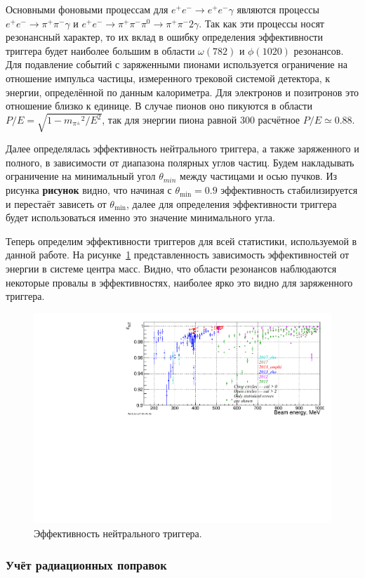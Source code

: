 Основными фоновыми процессам для $e^+ e^- \to e^+ e^-\gamma$ являются процессы
$e^+ e^- \to \pi^+ \pi^- \gamma$ и $e^+ e^- \to \pi^+ \pi^- \pi^0 \to \pi^+ \pi^- 2\gamma$.
Так как эти процессы носят резонансный характер,
то их вклад в ошибку определения эффективности триггера будет наиболее большим в области $\omega (782)$ и $\phi (1020)$ резонансов.
Для подавление событий с заряженными пионами используется ограничение на отношение импульса частицы,
измеренного трековой системой детектора, к энергии, определённой по данным калориметра.
Для электронов и позитронов это отношение близко к единице.
В случае пионов оно пикуются в области $P/E = \sqrt{1 - {m_{\pi^\pm}}^2 / E^2}$,
так для энергии пиона равной \SI{300}{\MeVr} расчётное $P/E \simeq 0.88$.

Далее определялась эффективность нейтрального триггера,
а также заряженного и полного, в зависимости от диапазона полярных углов частиц.
Будем накладывать ограничение на минимальный угол $\theta_{min}$ между частицами и осью пучков.
Из рисунка \textbf{рисунок} видно,
что начиная с $\theta_{\min} = 0.9$ эффективность стабилизируется и перестаёт зависеть от $\theta_{\min}$,
далее для определения эффективности триггера будет использоваться именно это значение минимального угла.

Теперь определим эффективности триггеров для всей статистики, используемой в данной работе.
На рисунке~\ref{fig:nt_eff} представленность зависимость эффективностей от энергии в системе центра масс.
Видно, что области резонансов наблюдаются некоторые провалы в эффективностях,
наиболее ярко это видно для заряженного триггера.


\begin{figure}
    \centering
    \includegraphics[width=\textwidth]{img/nt_eff.pdf}
    \caption{Эффективность нейтрального триггера.}
    \label{fig:nt_eff}
\end{figure}



\subsubsection{Учёт радиационных поправок}